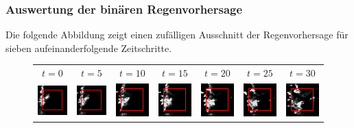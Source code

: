 
\subsubsection{Auswertung der binären Regenvorhersage}
Die folgende Abbildung zeigt einen zufälligen Ausschnitt der Regenvorhersage für sieben aufeinanderfolgende Zeitschritte.\\

\begin{figure}[h]
\begin{tabular}{lllllll}
\multicolumn{1}{c}{$t = 0$}  &
\multicolumn{1}{c}{$t = 5$}  &
\multicolumn{1}{c}{$t = 10$}  &
\multicolumn{1}{c}{$t = 15$}  &
\multicolumn{1}{c}{$t = 20$}  &
\multicolumn{1}{c}{$t = 25$}  &
\multicolumn{1}{c}{$t = 30$}  \\

\includegraphics[width=20mm]{abb/prediction/100_input_maxCont}&
\includegraphics[width=20mm]{abb/prediction/101_input_maxCont}&
\includegraphics[width=20mm]{abb/prediction/102_input_maxCont}&
\includegraphics[width=20mm]{abb/prediction/103_input_maxCont}&
\includegraphics[width=20mm]{abb/prediction/104_input_maxCont}&
\includegraphics[width=20mm]{abb/prediction/105_input_maxCont}&
\includegraphics[width=20mm]{abb/prediction/106_input_maxCont}\\


\end{tabular}
\end{figure}
